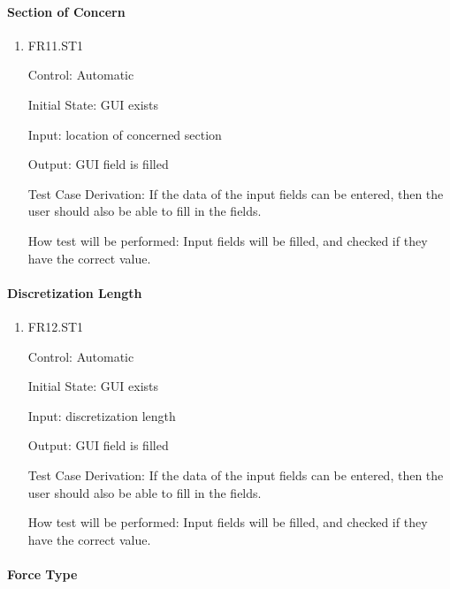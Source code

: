 \documentclass[12pt, titlepage]{article}
\begin{document}
\paragraph{Section of Concern}

\begin{enumerate}

  \item{FR11.ST1\\}

  Control: Automatic
            
  Initial State: GUI exists
            
  Input: location of concerned section
            
  Output: GUI field is filled

  Test Case Derivation: If the data of the input fields can be entered, then the user should also be able to fill in the fields.

  How test will be performed: Input fields will be filled, and checked if they have the correct value. 
					
\end{enumerate}

\paragraph{Discretization Length}

\begin{enumerate}

  \item{FR12.ST1\\}

Control: Automatic
					
Initial State: GUI exists
					
Input: discretization length 
					
Output: GUI field is filled

Test Case Derivation: If the data of the input fields can be entered, then the user should also be able to fill in the fields.

How test will be performed: Input fields will be filled, and checked if they have the correct value. 

\end{enumerate}

\paragraph{Force Type}
\end{document}
